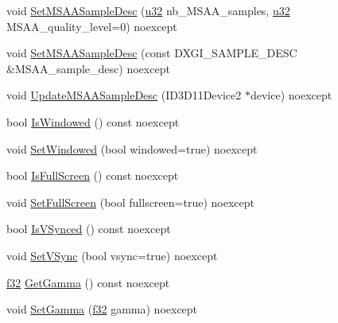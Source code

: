 \begin{DoxyCompactItemize}
\item 
void \hyperlink{structmage_1_1_display_configuration_afaed7124e8d0a2e2ffdb3236b78d6753}{Set\+M\+S\+A\+A\+Sample\+Desc} (\hyperlink{namespacemage_af2b398bf98eb10351f49cad73fe2cc73}{u32} nb\+\_\+\+M\+S\+A\+A\+\_\+samples, \hyperlink{namespacemage_af2b398bf98eb10351f49cad73fe2cc73}{u32} M\+S\+A\+A\+\_\+quality\+\_\+level=0) noexcept
\item 
void \hyperlink{structmage_1_1_display_configuration_abf2e5e21fe3fdde7a95fd518a882a8d1}{Set\+M\+S\+A\+A\+Sample\+Desc} (const D\+X\+G\+I\+\_\+\+S\+A\+M\+P\+L\+E\+\_\+\+D\+E\+SC \&M\+S\+A\+A\+\_\+sample\+\_\+desc) noexcept
\item 
void \hyperlink{structmage_1_1_display_configuration_a8eb7b1f0d0dbdd7ab384f61955609496}{Update\+M\+S\+A\+A\+Sample\+Desc} (I\+D3\+D11\+Device2 $\ast$device) noexcept
\item 
bool \hyperlink{structmage_1_1_display_configuration_ae35fedcd9989950c5f15785632dd7a86}{Is\+Windowed} () const noexcept
\item 
void \hyperlink{structmage_1_1_display_configuration_ac6228139b3fae3b5fb454aa072b94efd}{Set\+Windowed} (bool windowed=true) noexcept
\item 
bool \hyperlink{structmage_1_1_display_configuration_ab984b32ff2b6ce6a376aa09399b9b45e}{Is\+Full\+Screen} () const noexcept
\item 
void \hyperlink{structmage_1_1_display_configuration_a570746cd01c6a95c217aa03a954b5fd1}{Set\+Full\+Screen} (bool fullscreen=true) noexcept
\item 
bool \hyperlink{structmage_1_1_display_configuration_ab237c9b7953853eb83a51d542dfffb5e}{Is\+V\+Synced} () const noexcept
\item 
void \hyperlink{structmage_1_1_display_configuration_a7a14343be4f07dcdf4e8be66a118da29}{Set\+V\+Sync} (bool vsync=true) noexcept
\item 
\hyperlink{namespacemage_a6a44ad388483959dc4dff9f2aef91431}{f32} \hyperlink{structmage_1_1_display_configuration_a01e6d574b4fc99ef38f14061b7035963}{Get\+Gamma} () const noexcept
\item 
void \hyperlink{structmage_1_1_display_configuration_a5e0f9d62811645a69449ec0bc558c822}{Set\+Gamma} (\hyperlink{namespacemage_a6a44ad388483959dc4dff9f2aef91431}{f32} gamma) noexcept
\end{DoxyCompactItemize}
